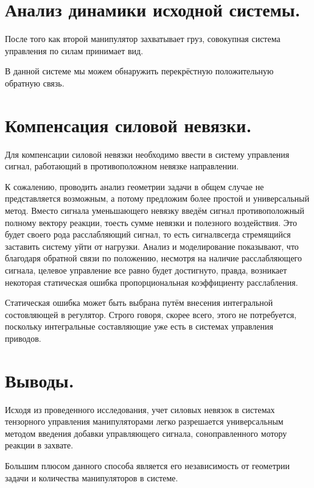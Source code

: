 \documentclass[a4paper]{article}
\begin{document}
\section{Анализ динамики исходной системы.}
После того как второй манипулятор захватывает груз, совокупная система управления по силам принимает вид.

В данной системе мы можем обнаружить перекрёстную положительную обратную связь.

\section{Компенсация силовой невязки.}
Для компенсации силовой невязки необходимо ввести в систему управления сигнал, работающий в противоположном невязке направлении. 

К сожалению, проводить анализ геометрии задачи в общем случае не представляется возможным, а потому предложим более простой и универсальный метод. Вместо сигнала уменьшающего невязку введём сигнал противоположный полному вектору реакции, тоесть сумме невязки и полезного воздействия. Это будет своего рода расслабляющий сигнал, то есть сигналвсегда стремящийся заставить систему уйти от нагрузки. Анализ и моделирование показывают, что благодаря обратной связи по положению, несмотря на наличие расслабляющего сигнала, целевое управление все равно будет достигнуто, правда, возникает некоторая статическая ошибка пропорциональная коэффициенту расслабления.

Статическая ошибка может быть выбрана путём внесения интегральной состовляющей в регулятор. Строго говоря, скорее всего, этого не потребуется, поскольку интегральные составляющие уже есть в системах управления приводов.

\section{Выводы.}
Исходя из проведенного исследования, учет силовых невязок в системах тензорного управления манипуляторами легко разрешается универсальным методом введения добавки управляющего сигнала, соноправленного мотору реакции в захвате.

Большим плюсом данного способа является его независимость от геометрии задачи и количества манипуляторов в системе.
\end{document}
